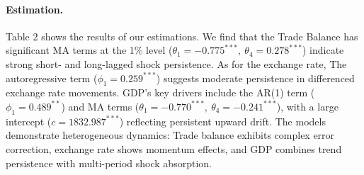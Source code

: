 \documentclass[
]{article}
\begin{document}
\paragraph*{Estimation.} Table 2 shows the results of our estimations. We find that the Trade Balance 
has significant MA terms at the 1\% level (\( \theta_1 = -0.775^{***},\ \theta_4 = 0.278^{***} \)) 
indicate strong short- and long-lagged shock persistence. As for the exchange rate,
The autoregressive term (\( \phi_1 = 0.259^{***} \)) suggests moderate persistence 
in differenced exchange rate movements. GDP's key drivers include the AR(1)
term (\( \phi_1 = 0.489^{**} \)) and MA terms (\( \theta_1 = -0.770^{***},\ 
\theta_4 = -0.241^{***} \)), with a large intercept (\( c = 1832.987^{***} \)) 
reflecting persistent upward drift. The models
demonstrate heterogeneous dynamics: Trade balance exhibits complex error correction, 
exchange rate shows momentum effects, and GDP combines trend persistence with 
multi-period shock absorption. 
\end{document}
